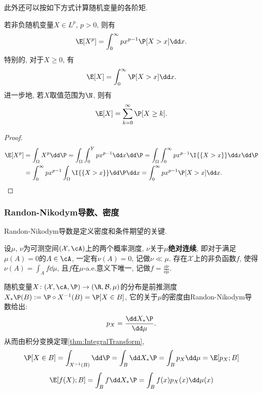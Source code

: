 此外还可以按如下方式计算随机变量的各阶矩. 
\begin{lemma}\label{lemma:trickOfExpectation}
	若非负随机变量$X \in L^p$, $p > 0$, 则有
	\begin{equation}
		\E [X^p] = \int_0^{\infty} p x^{p-1} \P[X > x] \dd x. 
	\end{equation}
	特别的, 对于$X \geq 0$, 有
	\begin{equation*}
		\E [X] = \int_0^{\infty} \P[X > x] \dd x. 
	\end{equation*}
	进一步地, 若$X$取值范围为$\N$, 则有
	\begin{equation*}
		\E [X] = \sum_{k=0}^{\infty} \P[X \geq k]. 
	\end{equation*}
\end{lemma}
\begin{proof}
	\begin{align*}
		\E [X^p] 
		&= \int_\Omega X^p \dd \P 
		= \int_\Omega \int_0^Y p x^{p-1} \dd x \dd \P 
		= \int_\Omega \int_0^{\infty} p x^{p-1} \I{\{X > x\}} \dd x \dd \P \\
		&= \int_0^{\infty} p x^{p-1} \int_\Omega \I{\{X > x\}} \dd \P \dd x
		= \int_0^{\infty} p x^{p-1} \P[X > x] \dd x.
	\end{align*}
\end{proof}


\subsubsection{Randon-Nikodym导数、密度}

Randon-Nikodym导数是定义密度和条件期望的关键. 

\begin{theorem}
	设$\mu$, $\nu$为可测空间$(\mathcal{X}, \cA)$上的两个概率测度, $\nu$关于$\mu$\textbf{绝对连续}, 即对于满足$\mu(A) = 0$的$A \in \cA$, 一定有$\nu(A) = 0$, 记做$\nu \ll \mu$. 
	存在$\mathcal{X}$上的非负函数$f$, 使得$\nu(A) = \int_A f \dd \mu$, 且$f$在$\mu$-a.e.意义下唯一, 记做$f = \frac{\dd \nu}{\dd \mu}$. 
\end{theorem}

\begin{example}[分布的密度]
	随机变量$X \colon (\mathcal{X}, \cA, \P) \to (\R, \mathcal{B}, \mu)$的分布是前推测度$X_* \P (B) := \P \circ X^{-1} (B) = \P[X \in B]$, 它的关于$\mu$的密度由Randon-Nikodym导数给出: 
	\begin{equation*}
		p_X = \frac{\dd X_* \P}{\dd \mu}. 
	\end{equation*}
	从而由积分变换定理\ref{thm:IntegralTransform}, 
	\begin{equation*}
		\P[X \in B] 
		= \int_{X^{-1}(B)} \dd \P 
		= \int_B \dd X_* \P 
		= \int_B p_X \dd \mu
		= \E[p_X; B]
	\end{equation*}
	\begin{equation*}
		\E[f(X); B]
		= \int_B f \dd X_* \P 
		= \int_B f(x) p_X(x) \dd \mu(x)
	\end{equation*}
\end{example}

